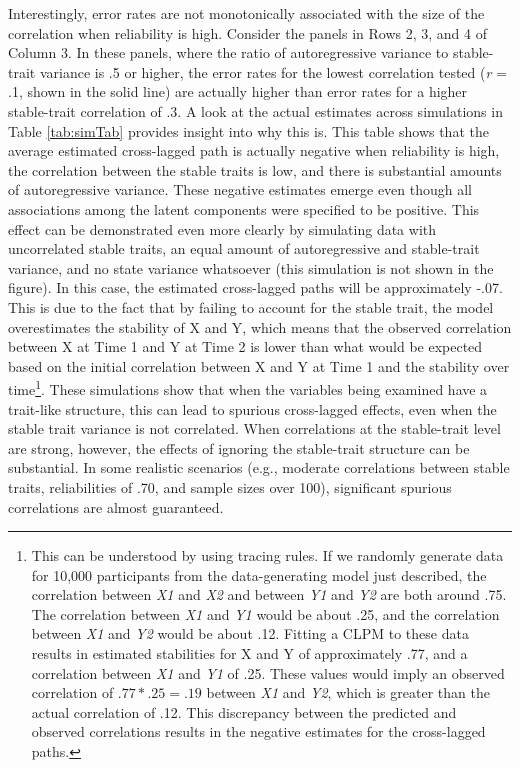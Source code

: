 \documentclass[
  english,
  man,floatsintext]{apa6}
\begin{document}
Interestingly, error rates are not monotonically associated with the size of the correlation when reliability is high. Consider the panels in Rows 2, 3, and 4 of Column 3. In these panels, where the ratio of autoregressive variance to stable-trait variance is .5 or higher, the error rates for the lowest correlation tested (\emph{r} = .1, shown in the solid line) are actually higher than error rates for a higher stable-trait correlation of .3. A look at the actual estimates across simulations in Table \ref{tab:simTab} provides insight into why this is. This table shows that the average estimated cross-lagged path is actually negative when reliability is high, the correlation between the stable traits is low, and there is substantial amounts of autoregressive variance. These negative estimates emerge even though all associations among the latent components were specified to be positive. This effect can be demonstrated even more clearly by simulating data with uncorrelated stable traits, an equal amount of autoregressive and stable-trait variance, and no state variance whatsoever (this simulation is not shown in the figure). In this case, the estimated cross-lagged paths will be approximately -.07. This is due to the fact that by failing to account for the stable trait, the model overestimates the stability of X and Y, which means that the observed correlation between X at Time 1 and Y at Time 2 is lower than what would be expected based on the initial correlation between X and Y at Time 1 and the stability over time\footnote{This can be understood by using tracing rules. If we randomly generate data for 10,000 participants from the data-generating model just described, the correlation between \emph{X1} and \emph{X2} and between \emph{Y1} and \emph{Y2} are both around .75. The correlation between \emph{X1} and \emph{Y1} would be about .25, and the correlation between \emph{X1} and \emph{Y2} would be about .12. Fitting a CLPM to these data results in estimated stabilities for X and Y of approximately .77, and a correlation between \emph{X1} and \emph{Y1} of .25. These values would imply an observed correlation of \(.77 * .25 = .19\) between \emph{X1} and \emph{Y2}, which is greater than the actual correlation of .12. This discrepancy between the predicted and observed correlations results in the negative estimates for the cross-lagged paths.}. These simulations show that when the variables being examined have a trait-like structure, this can lead to spurious cross-lagged effects, even when the stable trait variance is not correlated. When correlations at the stable-trait level are strong, however, the effects of ignoring the stable-trait structure can be substantial. In some realistic scenarios (e.g., moderate correlations between stable traits, reliabilities of .70, and sample sizes over 100), significant spurious correlations are almost guaranteed.
\end{document}
